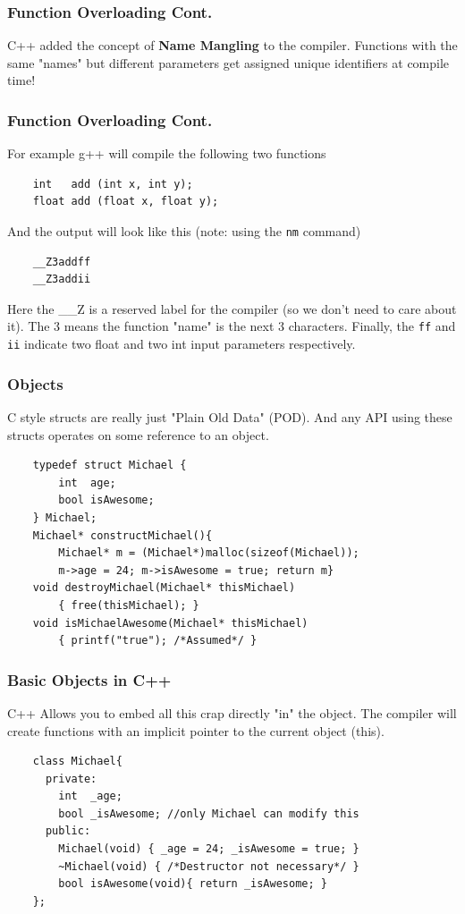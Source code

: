 \documentclass{beamer}
\begin{document}
\begin{frame}[fragile]
    \frametitle{Function Overloading Cont.}

    C++ added the concept of \textbf{Name Mangling} to the compiler.
    Functions with the same "names" but different parameters get assigned unique identifiers at compile time!
\end{frame}    
\begin{frame}[fragile]
    \frametitle{Function Overloading Cont.}
    For example g++ will compile the following two functions

    \begin{verbatim}
    int   add (int x, int y);
    float add (float x, float y); 
    \end{verbatim}
    And the output will look like this (note: using the \texttt{nm} command)
    \begin{verbatim}
    __Z3addff
    __Z3addii
    \end{verbatim}
    Here the \_\_Z is a reserved label for the compiler (so we don't need to care about it). 
    The 3 means the function "name" is the next 3 characters. Finally, the \texttt{ff} and \texttt{ii} indicate two float and two int input parameters respectively.

\end{frame}


\begin{frame}[fragile]
    \frametitle{Objects}
    C style structs are really just "Plain Old Data" (POD).
    And any API using these structs operates on some reference to an object.

    \begin{verbatim}
    typedef struct Michael {
        int  age;
        bool isAwesome;
    } Michael;
    Michael* constructMichael(){ 
        Michael* m = (Michael*)malloc(sizeof(Michael)); 
        m->age = 24; m->isAwesome = true; return m}
    void destroyMichael(Michael* thisMichael)
        { free(thisMichael); }
    void isMichaelAwesome(Michael* thisMichael)
        { printf("true"); /*Assumed*/ }
    \end{verbatim}


\end{frame}

\begin{frame}[fragile]
    \frametitle{Basic Objects in C++}
    C++ Allows you to embed all this crap directly "in" the object. The compiler will create functions with an implicit pointer to the current object (this).

    \begin{verbatim}
    class Michael{
      private:
        int  _age;
        bool _isAwesome; //only Michael can modify this
      public:
        Michael(void) { _age = 24; _isAwesome = true; }
        ~Michael(void) { /*Destructor not necessary*/ }
        bool isAwesome(void){ return _isAwesome; }
    };
    \end{verbatim}
\end{frame}
\end{document}
